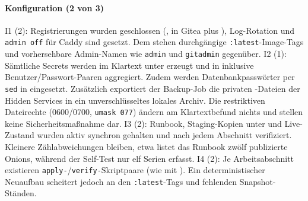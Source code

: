 \paragraph{Konfiguration (2 von 3)}
I1 (2): Registrierungen wurden geschlossen (,
in Gitea  plus ), Log-Rotation und \texttt{admin off} für Caddy sind gesetzt. Dem stehen durchgängige \texttt{:latest}-Image-Tags und
vorhersehbare Admin-Namen wie \texttt{admin} und \texttt{gitadmin} gegenüber.\cite{composeA,deployscriptA,selfauditA}
I2 (1): Sämtliche Secrets werden im Klartext unter  erzeugt und in  inklusive Benutzer/Passwort-Paaren aggregiert. 
Zudem werden Datenbankpasswörter per \texttt{sed} in  eingesetzt. 
Zusätzlich exportiert der Backup-Job die privaten -Dateien der Hidden
Services in ein unverschlüsseltes lokales Archiv. 
Die restriktiven Dateirechte (0600/0700, \texttt{umask 077}) ändern am Klartextbefund nichts und stellen keine Sicherheitsmaßnahme dar.\cite{deployscriptA,backupscriptA,selfauditA}
I3 (2): Runbook, Staging-Kopien unter  und Live-Zustand wurden aktiv synchron gehalten und nach jedem Abschnitt verifiziert. Kleinere Zählabweichungen bleiben, etwa listet das Runbook zwölf publizierte Onions, während der Self-Test nur elf Serien erfasst.\cite{runbookA}
I4 (2): Je Arbeitsabschnitt existieren \texttt{apply-}/\texttt{verify-}Skriptpaare (wie  mit ). 
Ein deterministischer Neuaufbau scheitert jedoch an den \texttt{:latest}-Tags und fehlenden
Snapshot-Ständen.\cite{runbookA,composeA}

